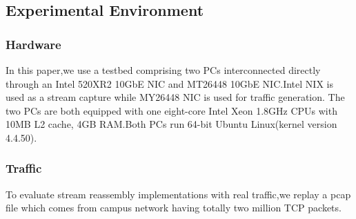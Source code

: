 \documentclass[conference]{IEEEtran}
\begin{document}
\subsection{Experimental Environment}

\subsubsection{Hardware}
In this paper,we use a testbed comprising two PCs interconnected directly through an Intel 520XR2 10GbE NIC and MT26448 10GbE NIC.Intel NIX is used as a stream capture while MY26448 NIC is used for traffic generation. The two PCs are both equipped with one eight-core Intel Xeon 1.8GHz CPUs with 10MB L2 cache, 4GB RAM.Both PCs run 64-bit Ubuntu Linux(kernel version 4.4.50).
\subsubsection{Traffic}
To evaluate stream reassembly implementations with real traffic,we replay a pcap file which comes from campus network having totally two million TCP packets.
\end{document}
